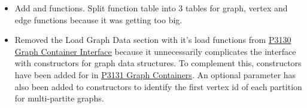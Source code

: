 \begin{itemize}
      \item Add  and  functions. Split function table into 3 tables for graph,
            vertex and edge functions because it was getting too big.
      \item Removed the Load Graph Data section with it's load functions from \href{https://www.wg21.link/P3130}{P3130 Graph Container Interface}
            because it unnecessarily complicates the interface with constructors for graph data structures. To complement this, constructors have 
            been added for  in \href{https://www.wg21.link/P3131}{P3131 Graph Containers}. An optional  
            parameter has also been added to constructors to identify the first vertex id of each partition for multi-partite graphs.
\end{itemize}
